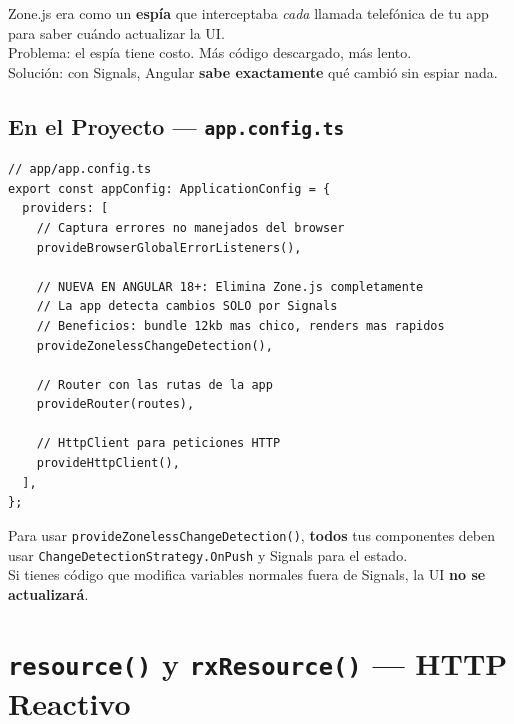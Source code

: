 \documentclass[12pt, a4paper]{article}
\begin{document}
\begin{tcolorbox}[analogia, title={\emoji{detective} \emoji{magnifying-glass-tilted-left} El Espía en Todas Partes}]
  Zone.js era como un \textbf{espía} que interceptaba \textit{cada} llamada telefónica
  de tu app para saber cuándo actualizar la UI.\\[0.3cm]
   Problema: el espía tiene costo. Más código descargado, más lento.\\
   Solución: con Signals, Angular \textbf{sabe exactamente} qué cambió
  sin espiar nada.
\end{tcolorbox}

\subsection{ En el Proyecto --- \texttt{app.config.ts}}

\begin{lstlisting}
// app/app.config.ts
export const appConfig: ApplicationConfig = {
  providers: [
    // Captura errores no manejados del browser
    provideBrowserGlobalErrorListeners(),

    // NUEVA EN ANGULAR 18+: Elimina Zone.js completamente
    // La app detecta cambios SOLO por Signals
    // Beneficios: bundle 12kb mas chico, renders mas rapidos
    provideZonelessChangeDetection(),

    // Router con las rutas de la app
    provideRouter(routes),

    // HttpClient para peticiones HTTP
    provideHttpClient(),
  ],
};
\end{lstlisting}

\begin{tcolorbox}[importante, title={\emoji{warning} \emoji{red-exclamation-mark} Requisito para Zoneless}]
  Para usar \texttt{provideZonelessChangeDetection()}, \textbf{todos} tus componentes
  deben usar \texttt{ChangeDetectionStrategy.OnPush} y Signals para el estado.\\[0.3cm]
  Si tienes código que modifica variables normales fuera de Signals, la UI \textbf{no se actualizará}.
\end{tcolorbox}

\section{  \texttt{resource()} y \texttt{rxResource()} --- HTTP Reactivo}
\end{document}
